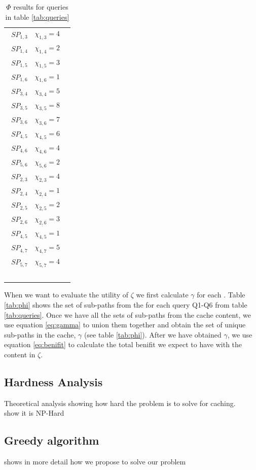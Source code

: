 \begin{table}
\begin{tabular}{r r l}
$SP_{1,3}$	& $\chi_{1,3} = 4$ \\\
$SP_{1,4}$	& $\chi_{1,4} = 2$ \\\
$SP_{1,5}$	& $\chi_{1,5} = 3$ \\\
$SP_{1,6}$	& $\chi_{1,6} = 1$ \\\
$SP_{3,4}$	& $\chi_{3,4} = 5$ \\\
$SP_{3,5}$	& $\chi_{3,5} = 8$ \\\
$SP_{3,6}$	& $\chi_{3,6} = 7$ \\\
$SP_{4,5}$	& $\chi_{4,5} = 6$ \\\
$SP_{4,6}$	& $\chi_{4,6} = 4$ \\\
$SP_{5,6}$	& $\chi_{5,6} = 2$ \\\
$SP_{2,3}$	& $\chi_{2,3} = 4$ \\\
$SP_{2,4}$	& $\chi_{2,4} = 1$ \\\
$SP_{2,5}$	& $\chi_{2,5} = 2$ \\\
$SP_{2,6}$	& $\chi_{2,6} = 3$ \\\
$SP_{4,5}$	& $\chi_{4,5} = 1$ \\\
$SP_{4,7}$	& $\chi_{4,7} = 5$ \\\
$SP_{5,7}$	& $\chi_{5,7} = 4$ \\\
\end{tabular}
\caption{$\Phi$ results for queries in table \ref{tab:queries}}
\label{tab:freq}
\end{table}

When we want to evaluate the utility of $\zeta$ we first calculate $\gamma$ for each \spath. Table \ref{tab:phi} shows the set of sub-paths from the \spaths for each query Q1-Q6 from table \ref{tab:queries}. Once we have all the sets of sub-paths from the cache content, we use equation \ref{eq:gamma} to union them together and obtain the set of unique sub-paths in the cache, $\gamma$ (see table \ref{tab:phi}). After we have obtained $\gamma$, we use equation \ref{eq:benifit} to calculate the total benifit we expect to have with the content in $\zeta$.

\subsection{Hardness Analysis}
Theoretical analysis showing how hard the problem is to solve for \spath caching.\\
show it is NP-Hard
 

\subsection{Greedy algorithm}
shows in more detail how we propose to solve our problem


